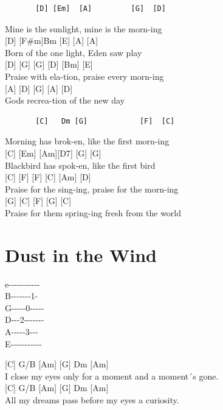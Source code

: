 \documentclass[
  letterpaper,
]{scrbook}
\begin{document}
\begin{verbatim}
       [D] [Em]  [A]         [G]  [D]
\end{verbatim}

Mine is the sunlight, mine is the morn-ing\\
{[}D{]} {[}F\#m{]}Bm {[}E{]} {[}A{]} {[}A{]}\\
Born of the one light, Eden saw play\\
{[}D{]} {[}G{]} {[}G{]} {[}D{]} {[}Bm{]} {[}E{]}\\
Praise with ela-tion, praise every morn-ing\\
{[}A{]} {[}D{]} {[}G{]} {[}A{]} {[}D{]}\\
God\textquotesingle s recrea-tion of the new day

\begin{verbatim}
       [C]   Dm [G]            [F]  [C]
\end{verbatim}

Morning has brok-en, like the first morn-ing\\
{[}C{]} {[}Em{]} {[}Am{]}{[}D7{]} {[}G{]} {[}G{]}\\
Blackbird has spok-en, like the first bird\\
{[}C{]} {[}F{]} {[}F{]} {[}C{]} {[}Am{]} {[}D{]}\\
Praise for the sing-ing, praise for the morn-ing\\
{[}G{]} {[}C{]} {[}F{]} {[}G{]} {[}C{]}\\
Praise for them spring-ing fresh from the world

\hypertarget{dust-in-the-wind}{%
\chapter{Dust in the Wind}\label{dust-in-the-wind}}

e\textbar-\/-\/-\/-\/-\/-\/-\/-\/-\/-\/-\textbar{}\\
B-\/-\/-\/-\/-\/-\/-1-\textbar{}\\
G\textbar-\/-\/-\/-\/-0-\/-\/-\/-\/-\textbar{}\\
D\textbar-\/-\/-2-\/-\/-\/-\/-\/-\/-\textbar{}\\
A-\/-\/-\/-\/-3-\/-\/-\textbar{}\\
E\textbar-\/-\/-\/-\/-\/-\/-\/-\/-\/-\/-\textbar{}

{[}C{]} G/B {[}Am{]} {[}G{]} Dm {[}Am{]}\\
I close my eyes only for a moment and a moment´s gone.\\
{[}C{]} G/B {[}Am{]} {[}G{]} Dm {[}Am{]}\\
All my dreams pass before my eyes a curiosity.
\end{document}
